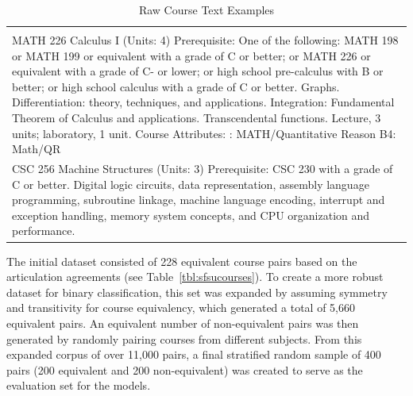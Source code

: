 {
\renewcommand{\arraystretch}{0.5}    
\begin{longtable}{ >{\raggedright\arraybackslash\baselineskip=12pt}p{} }
\captionsetup{skip=5pt}
\caption{Raw Course Text Examples}\label{tab:coursetext}\\
\midrule
\endfirsthead
\caption[]{Raw Course Text Examples}\\
\midrule
\endhead
MATH 226 Calculus I (Units: 4) \newline
Prerequisite: One of the following: MATH 198 or MATH 199 or equivalent with a grade of C or better; or MATH 226 or equivalent with a grade of C- or lower; or high school pre-calculus with B or better; or high school calculus with a grade of C or better. \newline
Graphs. Differentiation: theory, techniques, and applications. Integration: Fundamental Theorem of Calculus and applications. Transcendental functions. Lecture, 3 units; laboratory, 1 unit. \newline
Course Attributes: \newline
    2: MATH/Quantitative Reason \newline
    B4: Math/QR\\
\midrule
CSC 256 Machine Structures (Units: 3) \newline
Prerequisite: CSC 230 with a grade of C or better. \newline
Digital logic circuits, data representation, assembly language programming, subroutine linkage, machine language encoding, interrupt and exception handling, memory system concepts, and CPU organization and performance.\\
\bottomrule
\end{longtable}
}

The initial dataset consisted of 228 equivalent course pairs based on the articulation agreements (see Table~\ref{tbl:sfsucourses}). To create a more robust dataset for binary classification, this set was expanded by assuming symmetry and transitivity for course equivalency, which generated a total of 5,660 equivalent pairs. An equivalent number of non-equivalent pairs was then generated by randomly pairing courses from different subjects. From this expanded corpus of over 11,000 pairs, a final stratified random sample of 400 pairs (200 equivalent and 200 non-equivalent) was created to serve as the evaluation set for the models.

